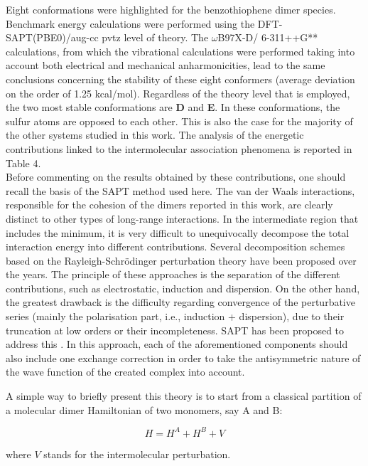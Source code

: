 		
		Eight conformations were highlighted for the benzothiophene dimer species. Benchmark energy calculations were performed using the DFT-SAPT(PBE0)/aug-cc pvtz level of theory. The $\omega$B97X-D/ 6-311++G** calculations, from which the vibrational calculations were performed taking into account both electrical and mechanical anharmonicities, lead to the same conclusions concerning the stability of these eight conformers (average deviation on the order of 1.25 kcal/mol). Regardless of the theory level that is employed, the two most stable conformations are \textbf{D} and \textbf{E}. In these conformations, the sulfur atoms are opposed to each other. This is also the case for the majority of the other systems studied in this work. The analysis of the energetic contributions linked to the intermolecular association phenomena is reported in Table 4.\\
		
		Before commenting on the results obtained by these contributions, one should recall the basis of the SAPT method used here. The van der Waals interactions, responsible for the cohesion of the dimers reported in this work, are clearly distinct to other types of long-range interactions. In the intermediate region that includes the minimum, it is very difficult to unequivocally decompose the total interaction energy into different contributions. Several decomposition schemes based on the Rayleigh-Schr\"{o}dinger perturbation theory have been proposed over the years. The principle of these approaches is the separation of the different contributions, such as electrostatic, induction and dispersion. On the other hand, the greatest drawback is the difficulty regarding convergence of the perturbative series (mainly the polarisation part, i.e., induction + dispersion), due to their truncation at low orders or their incompleteness. SAPT has been proposed to address this \cite{jeziorski1994perturbation}. In this approach, each of the aforementioned components should also include one exchange correction in order to take the antisymmetric nature of the wave function of the created complex into account. 
		
		A simple way to briefly present this theory is to start from a classical partition of a molecular dimer Hamiltonian of two monomers, say A and B:
		
		\begin{equation}
		H = H^{A} + H^{B} + V
		\end{equation}
		
		where $V$ stands for the intermolecular perturbation.\\
		
